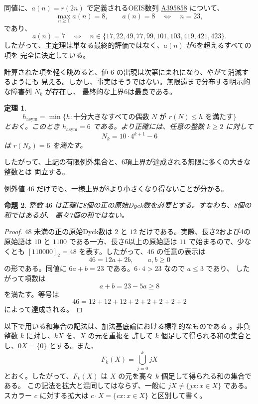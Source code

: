 \documentclass[12pt]{ltjsarticle}
\theoremstyle{plain}
\newtheorem{theorem}{定理}
\newtheorem{proposition}[theorem]{命題}
\theoremstyle{definition}
\theoremstyle{plain}
\newcommand{\seqnum}[1]{\href{https://oeis.org/#1}{\textrm{\underline{#1}}}}
\begin{document}
同値に、$a(n)=r(2n)$ で定義されるOEIS数列 \seqnum{A395858}
\cite{OEIS-A395858} について、
\[
        \max_{n\geq1}a(n)=8,
        \qquad
        a(n)=8\quad\Longleftrightarrow\quad n=23,
\]
であり、
\[
 a(n)=7
 \quad\Longleftrightarrow\quad
 n\in\{17,22,49,77,99,101,103,419,421,423\}.
\]
したがって、主定理は単なる最終的評価ではなく、$a(n)$ が6を超えるすべての項を
完全に決定している。

計算された項を軽く眺めると、値 $6$ の出現は次第にまれになり、やがて消滅するようにも
見える。しかし、事実はそうではない。無限遠まで分布する明示的な障害列 $N_k$ が存在し、
最終的な上界6は最良である。

\begin{theorem}\label{thm:asymptotic-order}
\[
 h_{\mathrm{asym}}
 =\min\{h:\text{十分大きなすべての偶数 }N\text{ が }r(N)\leq h\text{ を満たす}\}
\]
とおく。このとき $h_{\mathrm{asym}}=6$ である。より正確には、任意の整数
$k\geq2$ に対して
\[
 N_k=10\cdot4^{k+1}-6
\]
は $r(N_k)=6$ を満たす。
\end{theorem}

したがって、上記の有限例外集合と、6項上界が達成される無限に多くの大きな整数とは
両立する。

例外値 $46$ だけでも、一様上界が8より小さくなり得ないことが分かる。

\begin{proposition}\label{prop:46}
整数 $46$ は正確に8個の正の原始Dyck数を必要とする。すなわち、8個の和ではあるが、
高々7個の和ではない。
\end{proposition}

\begin{proof}
$48$ 未満の正の原始Dyck数は $2$ と $12$ だけである。実際、長さ2および4の原始語は
$10$ と $1100$ である一方、長さ6以上の原始語は $11$ で始まるので、少なくとも
$[110000]_2=48$ を表す。したがって、$46$ の任意の表示は
\[
        46=12a+2b,\qquad a,b\geq0
\]
の形である。同値に $6a+b=23$ である。$6\cdot4>23$ なので $a\leq3$ であり、
したがって項数は
\[
        a+b=23-5a\geq8
\]
を満たす。等号は
\[
        46=12+12+12+2+2+2+2+2
\]
によって達成される。
\end{proof}

以下で用いる和集合の記法は、加法基底論における標準的なものである
\cite[Chap.\ 1]{Nathanson}。非負整数 $k$ に対し、$kX$ を、$X$ の元を重複を
許して $k$ 個足して得られる和の集合とし、$0X=\{0\}$ とする。また、
\[
 F_k(X)=\bigcup_{j=0}^{k}jX
\]
とおく。したがって、$F_k(X)$ は $X$ の元を高々 $k$ 個足して得られる和の集合である。
この記法を拡大と混同してはならず、一般に $jX\neq\{jx:x\in X\}$ である。
スカラー $c$ に対する拡大は $c\cdot X=\{cx:x\in X\}$ と区別して書く。
\end{document}
